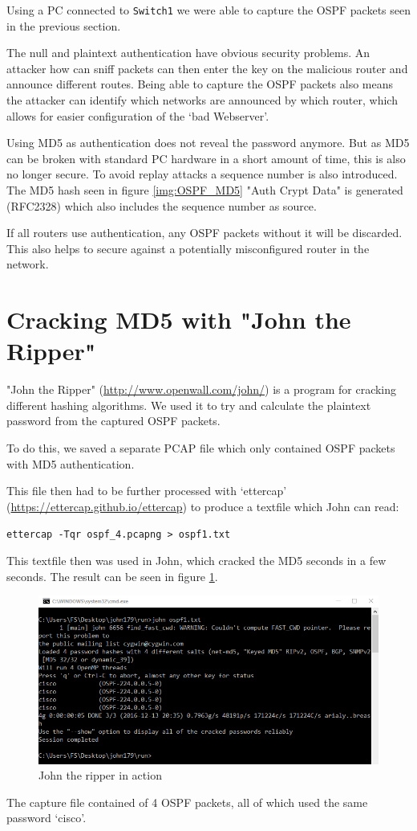 Using a PC connected to \texttt{Switch1} we were able to capture the OSPF packets seen in the previous section.

The null and plaintext authentication have obvious security problems. An attacker how can sniff packets can then enter the key on the malicious router and announce different routes.
Being able to capture the OSPF packets also means the attacker can identify which networks are announced by which router, which allows for easier configuration of the `bad Webserver'.

Using MD5 as authentication does not reveal the password anymore. But as MD5 can be broken with standard PC hardware in a short amount of time, this is also no longer secure. To avoid replay attacks a sequence number is also introduced. The MD5 hash seen in figure \ref{img:OSPF_MD5} "Auth Crypt Data" is generated (RFC2328) which also includes the sequence number as source.

If all routers use authentication, any OSPF packets without it will be discarded. This also helps to secure against a potentially misconfigured router in the network.

\section{Cracking MD5 with "John the Ripper"}

"John the Ripper" (\url{http://www.openwall.com/john/}) is a program for cracking different hashing algorithms. We used it to try and calculate the plaintext password from the captured OSPF packets.

To do this, we saved a separate PCAP file which only contained \ac{OSPF} packets with MD5 authentication.

This file then had to be further processed with `ettercap' (\url{https://ettercap.github.io/ettercap}) to produce a textfile which John can read:

\texttt{ettercap -Tqr ospf\_4.pcapng > ospf1.txt}

This textfile then was used in John, which cracked the MD5 seconds in a few seconds. The result can be seen in figure \ref{img:john}.

\begin{figure}[H]
	\centering
	\includegraphics[width=1.0\textwidth]{img/john.png}
	\caption{John the ripper in action}
	\label{img:john}
\end{figure}

The capture file contained of 4 OSPF packets, all of which used the same password `cisco'.
